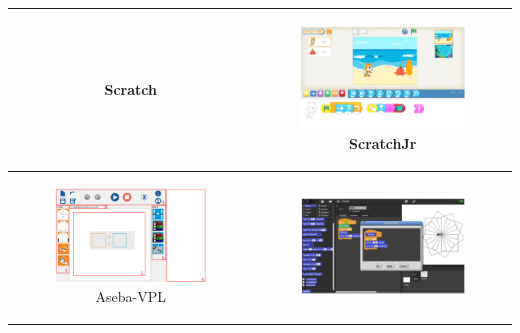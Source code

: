 \begin{table}[!h]
\begin{tabular}{|c|c|}
\begin{subfigure}{0.35\linewidth}
               \caption{\label{tab:Scratch}Scratch}
               \strut
               \end{subfigure}
                &
               \begin{subfigure}{0.35\linewidth}\centering
               \includegraphics[width=0.9\linewidth]{Figures/lang-JrScratch}
               \caption{\label{tab:ScratchJr}ScratchJr}
               \strut
               \end{subfigure}
                \\ \hline
               \begin{subfigure}{0.35\linewidth}\centering
               \includegraphics[width=0.9\linewidth]{Figures/lang-vpl2}
               \caption{\label{tab:VPL}Aseba-VPL}
               \strut
               \end{subfigure}
                &
               \begin{subfigure}{0.35\linewidth}\centering
               \includegraphics[width=0.9\linewidth]{Figures/lang-snap}

\end{subfigure}
\end{tabular}
\end{table}
